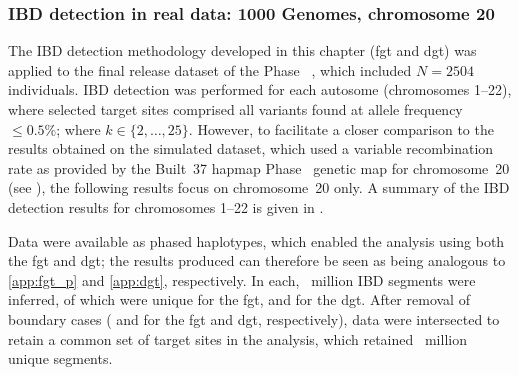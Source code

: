 %





%
\subsubsection{IBD detection in real data: 1000 Genomes, chromosome 20}\label{sec:fgt_dgt_1kg20}
%

The IBD detection methodology developed in this chapter (\gls{fgt} and \gls{dgt}) was applied to the final release dataset of the  Phase~ \citep{GenomesProjectConsortium:2012co,Auton:2015gk}, which included ${N=\num{2504}}$ individuals.
IBD detection was performed for each autosome (chromosomes \mbox{1--22}), where selected target sites comprised all variants found at allele frequency ${\leq 0.5\%}$; \ie \fk{} where ${k \in \{2, \ldots, 25\}}$.
However, to facilitate a closer comparison to the results obtained on the simulated dataset, which used a variable recombination rate as provided by the Built~37 \gls{hapmap} Phase~ genetic map for chromosome~20 (see ), the following results focus on chromosome~20 only.
A summary of the IBD detection results for chromosomes \mbox{1--22} is given in .

%

%

Data were available as phased haplotypes, which enabled the analysis using both the \gls{fgt} and \gls{dgt}; \ie the results produced can therefore be seen as being analogous to \cref{app:fgt_p} and \cref{app:dgt}, respectively.
In each, ~million IBD segments were inferred, of which  were unique for the \gls{fgt}, and  for the \gls{dgt}.
After removal of boundary cases ( and  for the \gls{fgt} and \gls{dgt}, respectively), data were intersected to retain a common set of target sites in the analysis, which retained ~million unique segments.

